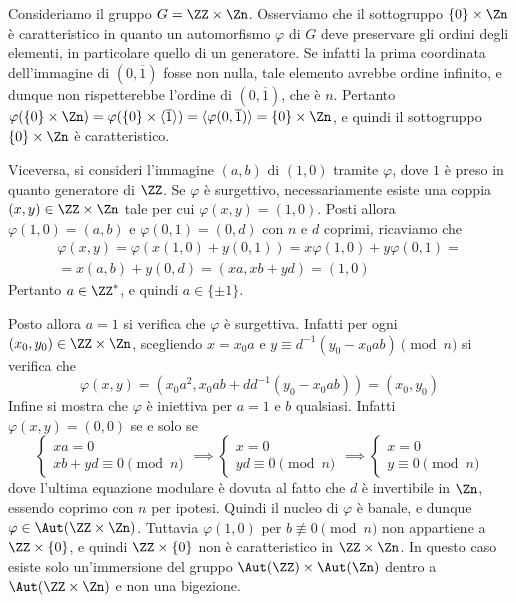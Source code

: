 \documentclass[11pt]{scrartcl}
\begin{document}
	\begin{example}
		Consideriamo il gruppo $G = \ZZ \times \Zn$. Osserviamo che il sottogruppo 
		$\{0\}\times \Zn$ è caratteristico in quanto un automorfismo $\varphi$ di $G$ deve
		preservare gli ordini degli elementi, in particolare quello di un generatore. Se
		infatti la prima coordinata dell'immagine di $(0, \overline{1})$ fosse non nulla,
		tale elemento avrebbe ordine infinito, e dunque non rispetterebbe l'ordine
		di $(0, \overline{1})$, che è $n$. 
		Pertanto $\varphi(\{0\} \times \Zn) = \varphi(\{0\} \times \langle \overline{1} \rangle) =
		\langle \varphi(0, \overline{1}) \rangle = \{0\} \times \Zn$, e quindi il
		sottogruppo $\{0\} \times \Zn$ è caratteristico. \medskip
		

        Viceversa, si consideri l'immagine $(a, b)$ di $(1, 0)$ tramite $\varphi$, dove $1$ è preso in quanto generatore
        di $\ZZ$. Se $\varphi$ è
		surgettivo, necessariamente esiste una coppia $(x, y) \in \ZZ\times \Zn$ tale per cui
		$\varphi(x, y) = (1, 0)$. Posti allora $\varphi(1, 0) = (a, b)$ e
		$\varphi(0, 1) = (0, d)$ con $n$ e $d$ coprimi, ricaviamo che
		\begin{multline*}
			\varphi(x, y) = \varphi(x(1, 0) + y(0, 1)) = x\varphi(1, 0) + y\varphi(0, 1) = \\
			= x(a, b) + y(0, d) = (xa, xb + yd) = (1, 0)
		\end{multline*}
		Pertanto $a \in \ZZ^*$, e quindi $a \in \{\pm 1\}$. \medskip
		

		Posto allora $a = 1$ si verifica che $\varphi$ è surgettiva. Infatti 
		per ogni $(x_0, y_0) \in \ZZ\times\Zn$, scegliendo
		$x = x_0a$ e $y \equiv d^{-1}(y_0 - x_0ab)\pmod n$ si verifica che \[
		\varphi(x, y) = (x_0a^2, x_0ab + d d^{-1}(y_0 - x_0ab)) = (x_0, y_0)
		\]
		Infine si mostra che $\varphi$ è iniettiva per $a = 1$ e
		$b$ qualsiasi. Infatti
		$\varphi(x, y) = (0, 0)$ se e solo se
		\[ \begin{cases}
			xa = 0 \\
			xb + yd \equiv 0 \pmod n
		\end{cases} \implies
		\begin{cases}
			x = 0 \\
			yd \equiv 0 \pmod n
		\end{cases} \implies
		\begin{cases}
			x = 0 \\
			y \equiv 0 \pmod n
		\end{cases}
		\]
		dove l'ultima equazione modulare è dovuta al fatto che $d$ è invertibile in
		$\Zn$, essendo coprimo con $n$ per ipotesi. Quindi il nucleo di $\varphi$
		è banale, e dunque $\varphi \in \Aut(\ZZ \times \Zn)$. Tuttavia
		$\varphi(1, 0)$ per $b \not\equiv 0 \pmod n$ non appartiene a $\ZZ \times \{0\}$, e quindi
		$\ZZ \times \{0\}$ non è caratteristico in $\ZZ \times \Zn$.
		 In questo caso esiste solo un'immersione del gruppo
		$\Aut(\ZZ) \times \Aut(\Zn)$ dentro a $\Aut(\ZZ\times \Zn)$ e non una
		bigezione.
	\end{example}
	
\end{document}
